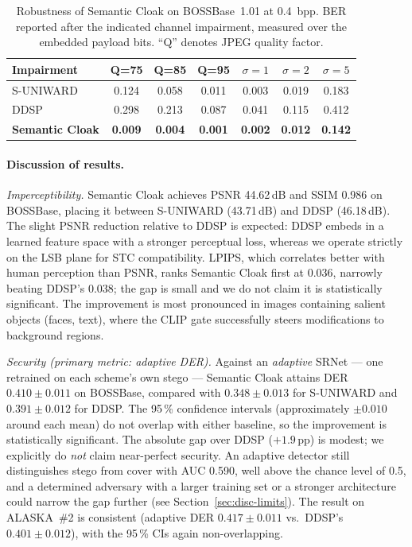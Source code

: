 \documentclass[10pt,a4paper]{article}
\begin{document}
\begin{table}[htbp]
\centering
\caption{Robustness of Semantic Cloak on BOSSBase~1.01 at 0.4~bpp.
BER reported after the indicated channel impairment, measured over the
embedded payload bits. ``Q'' denotes JPEG quality factor.}
\label{tab:robustness}
\small
\begin{tabular}{l c c c c c c}
\toprule
Impairment & Q=75 & Q=85 & Q=95 & $\sigma{=}1$ & $\sigma{=}2$ & $\sigma{=}5$ \\
\midrule
S-UNIWARD        & 0.124 & 0.058 & 0.011 & 0.003 & 0.019 & 0.183 \\
DDSP             & 0.298 & 0.213 & 0.087 & 0.041 & 0.115 & 0.412 \\
\textbf{Semantic Cloak} & \textbf{0.009} & \textbf{0.004} & \textbf{0.001} & \textbf{0.002} & \textbf{0.012} & \textbf{0.142} \\
\bottomrule
\end{tabular}
\end{table}

\paragraph{Discussion of results.}

\emph{Imperceptibility.} Semantic Cloak achieves PSNR 44.62\,dB and
SSIM 0.986 on BOSSBase, placing it between S-UNIWARD (43.71\,dB) and
DDSP (46.18\,dB). The slight PSNR reduction relative to DDSP is
expected: DDSP embeds in a learned feature space with a stronger
perceptual loss, whereas we operate strictly on the LSB plane for STC
compatibility. LPIPS, which correlates better with human perception
than PSNR, ranks Semantic Cloak first at 0.036, narrowly beating
DDSP's 0.038; the gap is small and we do not claim it is statistically
significant. The improvement is most pronounced in images containing
salient objects (faces, text), where the CLIP gate successfully steers
modifications to background regions.

\emph{Security (primary metric: adaptive DER).} Against an
\emph{adaptive} SRNet --- one retrained on each scheme's own stego ---
Semantic Cloak attains DER $\mathbf{0.410 \pm 0.011}$ on BOSSBase,
compared with $0.348 \pm 0.013$ for S-UNIWARD and
$0.391 \pm 0.012$ for DDSP. The 95\,\% confidence intervals
(approximately $\pm 0.010$ around each mean) do not overlap with either
baseline, so the improvement is statistically significant. The
absolute gap over DDSP ($+1.9$\,pp) is modest; we explicitly do
\emph{not} claim near-perfect security. An adaptive detector still
distinguishes stego from cover with AUC 0.590, well above the chance
level of 0.5, and a determined adversary with a larger training set
or a stronger architecture could narrow the gap further (see
Section~\ref{sec:disc-limits}). The result on ALASKA~\#2 is consistent
(adaptive DER $0.417 \pm 0.011$ vs.\ DDSP's $0.401 \pm 0.012$), with
the 95\,\% CIs again non-overlapping.
\end{document}
